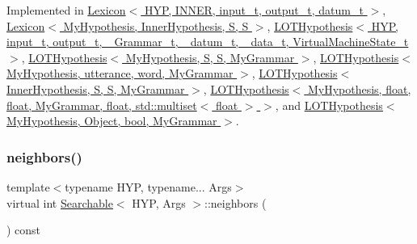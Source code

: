 Implemented in \hyperlink{class_lexicon_a88a02f88387f436c6ff4c060735291ea}{Lexicon$<$ H\+Y\+P, I\+N\+N\+E\+R, input\+\_\+t, output\+\_\+t, datum\+\_\+t $>$}, \hyperlink{class_lexicon_a88a02f88387f436c6ff4c060735291ea}{Lexicon$<$ My\+Hypothesis, Inner\+Hypothesis, S, S $>$}, \hyperlink{class_l_o_t_hypothesis_a997c88cb84133efc599b9b14173aefe9}{L\+O\+T\+Hypothesis$<$ H\+Y\+P, input\+\_\+t, output\+\_\+t, \+\_\+\+Grammar\+\_\+t, \+\_\+datum\+\_\+t, \+\_\+data\+\_\+t, Virtual\+Machine\+State\+\_\+t $>$}, \hyperlink{class_l_o_t_hypothesis_a997c88cb84133efc599b9b14173aefe9}{L\+O\+T\+Hypothesis$<$ My\+Hypothesis, S, S, My\+Grammar $>$}, \hyperlink{class_l_o_t_hypothesis_a997c88cb84133efc599b9b14173aefe9}{L\+O\+T\+Hypothesis$<$ My\+Hypothesis, utterance, word, My\+Grammar $>$}, \hyperlink{class_l_o_t_hypothesis_a997c88cb84133efc599b9b14173aefe9}{L\+O\+T\+Hypothesis$<$ Inner\+Hypothesis, S, S, My\+Grammar $>$}, \hyperlink{class_l_o_t_hypothesis_a997c88cb84133efc599b9b14173aefe9}{L\+O\+T\+Hypothesis$<$ My\+Hypothesis, float, float, My\+Grammar, float, std\+::multiset$<$ float $>$ $>$}, and \hyperlink{class_l_o_t_hypothesis_a997c88cb84133efc599b9b14173aefe9}{L\+O\+T\+Hypothesis$<$ My\+Hypothesis, Object, bool, My\+Grammar $>$}.

\mbox{\label{class_searchable_aec30063fcc9bed5d005f8318efa8492d}} 
\subsubsection{\texorpdfstring{neighbors()}{neighbors()}}
{\footnotesize\ttfamily template$<$typename H\+YP, typename... Args$>$ \\
virtual int \hyperlink{class_searchable}{Searchable}$<$ H\+YP, Args $>$\+::neighbors (\begin{DoxyParamCaption}{ }\end{DoxyParamCaption}) const\hspace{0.3cm}{\ttfamily [pure virtual]}}



